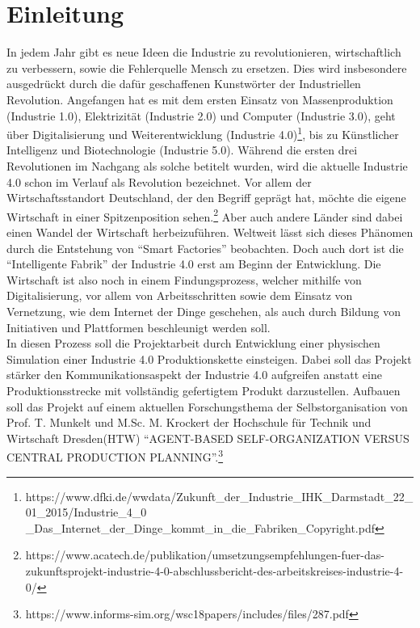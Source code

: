 \chapter{Einleitung}


In jedem Jahr gibt es neue Ideen die Industrie zu revolutionieren, wirtschaftlich zu verbessern, sowie die Fehlerquelle Mensch zu ersetzen. Dies wird insbesondere ausgedrückt durch die dafür geschaffenen Kunstwörter der Industriellen Revolution. Angefangen hat es mit dem ersten Einsatz von Massenproduktion (Industrie 1.0), Elektrizität (Industrie 2.0) und Computer (Industrie 3.0), geht über Digitalisierung und Weiterentwicklung (Industrie 4.0)\footnote{https://www.dfki.de/wwdata/Zukunft\_der\_Industrie\_IHK\_Darmstadt\_22\_01\_2015/Industrie\_4\_0\\\_Das\_Internet\_der\_Dinge\_kommt\_in\_die\_Fabriken\_Copyright.pdf}, bis zu Künstlicher Intelligenz und Biotechnologie (Industrie 5.0). Während die ersten drei Revolutionen im Nachgang als solche betitelt wurden, wird die aktuelle Industrie 4.0 schon im Verlauf als Revolution bezeichnet. Vor allem der Wirtschaftsstandort Deutschland, der den Begriff geprägt hat, möchte die eigene Wirtschaft in einer Spitzenposition sehen.\footnote{https://www.acatech.de/publikation/umsetzungsempfehlungen-fuer-das-zukunftsprojekt-industrie-4-0-abschlussbericht-des-arbeitskreises-industrie-4-0/} Aber auch andere Länder sind dabei einen Wandel der Wirtschaft herbeizuführen. Weltweit lässt sich dieses Phänomen durch die Entstehung von \enquote{Smart Factories} beobachten. Doch auch dort ist die \enquote{Intelligente Fabrik} der Industrie 4.0 erst am Beginn der Entwicklung. Die Wirtschaft ist also noch in einem Findungsprozess, welcher mithilfe von Digitalisierung, vor allem von Arbeitsschritten sowie dem Einsatz von Vernetzung, wie dem Internet der Dinge geschehen, als auch durch Bildung von Initiativen und Plattformen beschleunigt werden soll.\\
In diesen Prozess soll die Projektarbeit durch Entwicklung einer physischen Simulation einer Industrie 4.0 Produktionskette einsteigen. Dabei soll das Projekt stärker den Kommunikationsaspekt der Industrie 4.0 aufgreifen anstatt eine Produktionsstrecke mit vollständig gefertigtem Produkt darzustellen. Aufbauen soll das Projekt auf einem aktuellen Forschungsthema der Selbstorganisation von Prof. T. Munkelt und M.Sc. M. Krockert der Hochschule für Technik und Wirtschaft Dresden(HTW) \enquote{AGENT-BASED SELF-ORGANIZATION VERSUS CENTRAL PRODUCTION PLANNING}.\footnote{https://www.informs-sim.org/wsc18papers/includes/files/287.pdf}\\
